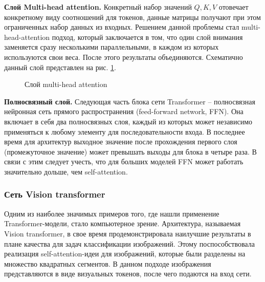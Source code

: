 \documentclass[14pt,a4paper]{extarticle}
\begin{document}
\textbf{Слой Multi-head attention.} Конкретный набор значений $Q, K, V$ отовечает конкретному виду соотношений для токенов, данные матрицы получают при этом ограниченных набор данных из входных. Решением данной проблемы стал multi-head-attention подход, который заключается в том, что один слой внимания заменяется сразу несколькими параллельными, в каждом из которых используются свои веса. После этого результаты объединяются. Схематично данный слой представлен на рис. \ref{mul_head_lbl}.
\begin{figure}[h]
\caption{Слой multi-head attention}
\label{mul_head_lbl}
\end{figure}  


\textbf{Полносвязный слой.} Следующая часть блока сети Transformer -- полносвязная нейронная сеть прямого распространения (feed-forward network, FFN). Она включает в себя два полносвязных слоя, каждый из которых может независимо применяться к любому элементу для последовательности входа. В последнее время для архитектур выходное значение после прохождения первого слоя (промежуточное значение) может превышать выходы для блока в четыре раза. В связи с этим следует учесть, что для больших моделей FFN может работать значительно дольше, чем self-attention. 


\subsubsection*{Сеть Vision transformer}
Одним из наиболее значимых примеров того, где нашли применение Trans\-for\-mer-модели, стало компьютерное зрение. Архитектура, называемая Vision trans\-for\-mer, в свое время продемонстрировала наилучшие результаты в плане качества для задач классификации изображений. Этому поспособствовала реализация self-attention-идеи для изображений, которые были разделены на множество квадратных сегментов. В данном подходе изображения представляются в виде визуальных токенов, после чего подаются на вход сети. 
\end{document}
